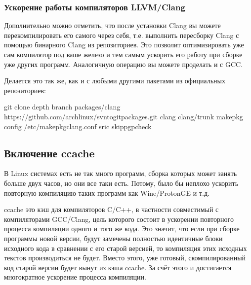 \documentclass[letterpaper,10pt,russian,openany]{sphinxmanual}
\begin{document}
\subsubsection{Ускорение работы компиляторов LLVM/Clang}
\label{\detokenize{source/generic-system-acceleration:llvm-clang}}\label{\detokenize{source/generic-system-acceleration:speeding-up-clang-llvm-compilers}}\label{\detokenize{source/generic-system-acceleration:index-2}}
\sphinxAtStartPar
Дополнительно можно отметить, что после установки Clang вы можете перекомпилировать его самого через себя,
т.е. выполнить пересборку Clang с помощью бинарного Clang из репозиториев.
Это позволит оптимизировать уже сам компилятор под ваше железо и тем самым ускорить
его работу при сборке уже других программ. Аналогичную операцию вы можете проделать и с GCC.

\sphinxAtStartPar
Делается это так же, как и с любыми другими пакетами из официальных репозиториев:

\begin{sphinxVerbatim}[commandchars=\\\{\}]
git clone \PYGZhy{}\PYGZhy{}depth  \PYGZhy{}\PYGZhy{}branch packages/clang https://github.com/archlinux/svntogit\PYGZhy{}packages.git clang
 clang/trunk
makepkg \PYGZhy{}\PYGZhy{}config /etc/makepkg\PYGZhy{}clang.conf \PYGZhy{}sric \PYGZhy{}\PYGZhy{}skippgpcheck
\end{sphinxVerbatim}

\ignorespaces 

\subsection{Включение ccache}
\label{\detokenize{source/generic-system-acceleration:ccache}}\label{\detokenize{source/generic-system-acceleration:enabling-ccache}}\label{\detokenize{source/generic-system-acceleration:index-3}}
\sphinxAtStartPar
В Linux системах есть не так много программ, сборка которых может занять больше двух часов,
но они все таки есть. Потому, было бы неплохо ускорить повторную компиляцию таких программ как Wine/Proton\sphinxhyphen{}GE и т.д.

\sphinxAtStartPar
ccache \sphinxhyphen{} это кэш для компиляторов C/C++, в частности совместимый с компиляторами GCC/Clang,
цель которого состоит в ускорении повторного процесса компиляции одного и того же кода.
Это значит, что если при сборке программы новой версии, будут замечены полностью идентичные блоки исходного кода в сравнении с его старой версией,
то компиляция этих исходных текстов производиться не будет. Вместо этого, уже готовый, скомпилированный код старой версии будет вынут из кэша ccache.
За счёт этого и достигается многократное ускорение процесса компиляции.
\end{document}
